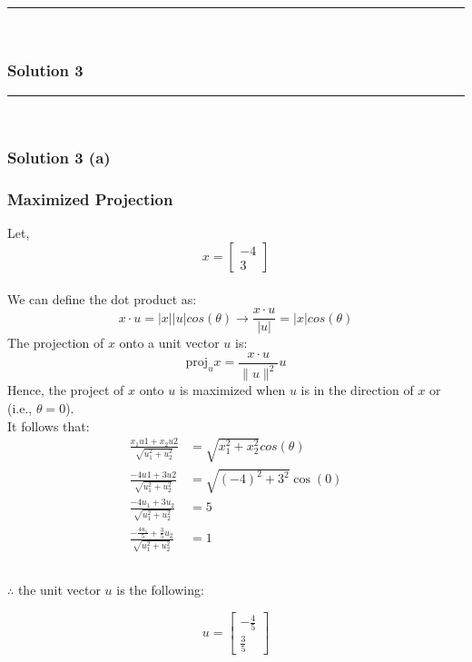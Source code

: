 \documentclass{article}
\begin{document}
\noindent\rule{\textwidth}{0.4pt}\\

\newpage

\subsubsection*{Solution 3}
\noindent\rule{\textwidth}{0.4pt}\\
\subsubsection*{Solution 3 (a)}
\subsubsection*{Maximized Projection}
Let, \\ 
$$x = \begin{bmatrix}-4 \\ 3\end{bmatrix}$$ \\
We can define the dot product as:
$$x \cdot u = |x||u|cos(\theta) \rightarrow \frac{x \cdot u}{|u|} = |x|cos(\theta)$$
The projection of $x$ onto a unit vector $u$ is:
$$\text{proj}_u x = \frac{x \cdot u}{\|u\|^2} u $$
Hence, the project of $x$ onto $u$ is maximized when $u$ is in the direction of $x$ or (i.e., $\theta=0$). \\
It follows that:
\begin{align*}
    \frac{x_1u1 + x_2u2}{\sqrt{u_{1}^{2}+u_{2}^{2}}} &= \sqrt{x_{1}^{2}+x_{2}^{2}}cos(\theta) \\
    \frac{-4u1 + 3u2}{\sqrt{u_{1}^{2}+u_{2}^{2}}} &= \sqrt{(-4)^{2}+3^{2}}\cos(0) \\
    \frac{-4u_1 + 3u_2}{\sqrt{u_{1}^{2}+u_{2}^{2}}} &= 5 \\
    \frac{-\frac{4u_1}{5} + \frac{3}{5}u_2}{\sqrt{u_{1}^{2}+u_{2}^{2}}} &= 1 \\
\end{align*}

\subsubsection*{\normalfont}{$\therefore$ the unit vector $u$ is the following:}

$$u = \begin{bmatrix} -\frac{4}{5} \\[4pt] \frac{3}{5} \end{bmatrix}$$
\end{document}
